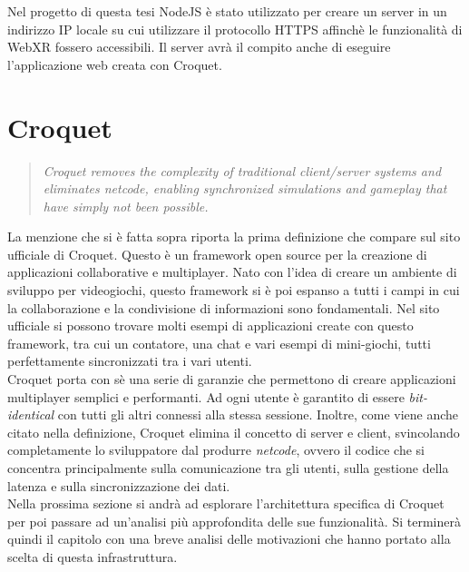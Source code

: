 Nel progetto di questa tesi NodeJS è stato utilizzato per creare un server in un indirizzo IP locale su cui utilizzare il protocollo HTTPS affinchè le funzionalità di WebXR fossero
accessibili. Il server avrà il compito anche di eseguire l'applicazione web creata con Croquet.


\section{Croquet}\label{sec:Croquet}
\begin{quote}
    \textit{Croquet removes the complexity of traditional client/server systems and eliminates netcode, enabling synchronized simulations and gameplay that have simply not been 
    possible.}\cite{Croquet}
\end{quote}
La menzione che si è fatta sopra riporta la prima definizione che compare sul sito ufficiale di Croquet. Questo è un framework open source per la creazione di applicazioni 
collaborative e multiplayer. Nato con l'idea di creare un ambiente di sviluppo per videogiochi, questo framework si è poi espanso a tutti i campi in cui la collaborazione e la condivisione
di informazioni sono fondamentali. Nel sito ufficiale si possono trovare molti esempi di applicazioni create con questo framework, tra cui un contatore, una chat e vari esempi di mini-giochi, tutti
perfettamente sincronizzati tra i vari utenti.\\
Croquet porta con sè una serie di garanzie che permettono di creare applicazioni multiplayer semplici e performanti. Ad ogni utente
è garantito di essere \textit{bit-identical} con tutti gli altri connessi alla stessa sessione. Inoltre, come viene anche citato nella definizione, Croquet elimina il concetto
di server e client, svincolando completamente lo sviluppatore dal produrre \textit{netcode}, ovvero il codice che si concentra principalmente sulla comunicazione tra gli utenti,
sulla gestione della latenza e sulla sincronizzazione dei dati.\\ 
Nella prossima sezione si andrà ad esplorare l'architettura specifica di Croquet per poi passare ad un'analisi più approfondita delle sue funzionalità. Si terminerà quindi il capitolo
con una breve analisi delle motivazioni che hanno portato alla scelta di questa infrastruttura.\\

